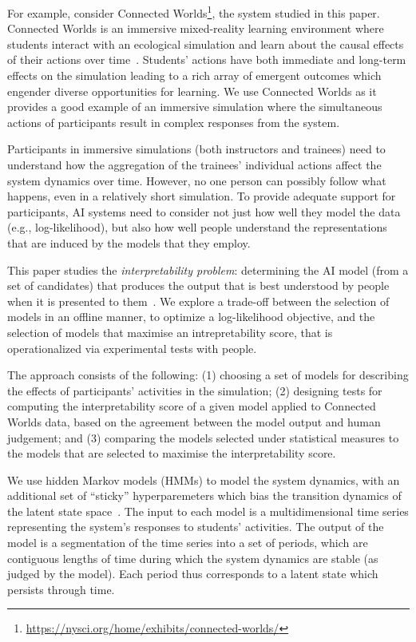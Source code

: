 \documentclass[letterpaper]{article}
\begin{document}
For example, consider Connected Worlds\footnote{\url{https://nysci.org/home/exhibits/connected-worlds/}},  the system studied in this paper. Connected Worlds is
an immersive mixed-reality learning environment
where students interact with an ecological simulation and learn about the causal effects of their actions over time~\cite{mallavarapu2019connect}.
Students' actions have both immediate and long-term effects on the simulation leading to a rich array of emergent outcomes which engender diverse opportunities for learning.
We use Connected Worlds as it provides a good example of an immersive simulation where the simultaneous actions of participants result in complex responses from the system.

Participants in immersive simulations (both instructors and trainees) need to understand how the aggregation of the trainees' individual actions affect the system dynamics over time.
However, no one person can possibly follow what happens, even in a relatively short simulation.
To provide adequate support for participants, AI systems need to consider not just how well they model the data (e.g., log-likelihood), but also how well people understand the representations that are induced by the models that they employ.

This paper studies the \emph{interpretability problem}: determining the AI model (from a set of candidates) that produces the output that is  best understood by people when it is presented  to them~\cite{gilpin2018explaining,doshi2017roadmap,caruana2015intelligible}.
We explore a trade-off between the selection of models in an offline manner, to optimize a log-likelihood objective, and the selection of models that maximise an intrepretability score, that is operationalized via experimental tests with people.

The approach consists of the following:
(1) choosing a set of models for describing the effects of participants' activities in the simulation;
(2) designing tests for computing the interpretability score of a given model applied to Connected Worlds data, based on the agreement between the model output and human judgement; and
(3) comparing the models selected under statistical measures to the models that are selected to maximise the interpretability score.


We use hidden Markov models (HMMs) to model the system dynamics, with an additional set of ``sticky'' hyperparemeters which bias the transition dynamics of the latent state space~\cite{fox2008hdp}.
The input to each model is a multidimensional time series representing the system's responses to students' activities.
The output of the model is a segmentation of the time series into a set of periods, which are contiguous lengths of time during which the system
dynamics are stable (as judged by the model). Each period thus corresponds to a latent state which persists through time.
\end{document}
